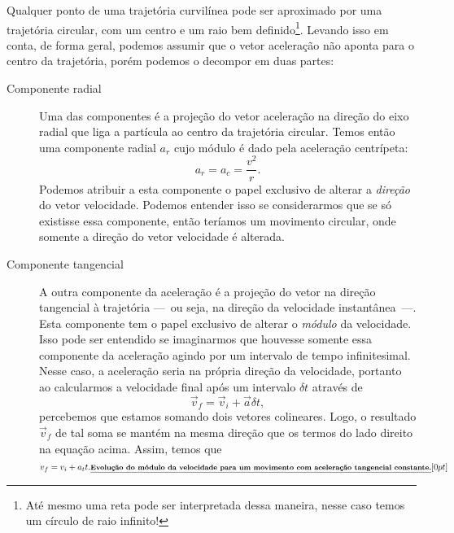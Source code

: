 Qualquer ponto de uma trajetória curvilínea pode ser aproximado por uma trajetória circular, com um centro e um raio bem definido\footnote{Até mesmo uma reta pode ser interpretada dessa maneira, nesse caso temos um círculo de raio infinito!}. Levando isso em conta, de forma geral, podemos assumir que o vetor aceleração não aponta para o centro da trajetória, porém podemos o decompor em duas partes:
\begin{description}
  \item[Componente radial] Uma das componentes é a projeção do vetor aceleração na direção do eixo radial que liga a partícula ao centro da trajetória circular. Temos então uma componente radial $a_r$ cujo módulo é dado pela aceleração centrípeta:
  \begin{equation}
    a_r = a_c = \frac{v^2}{r}.
  \end{equation}
  Podemos atribuir a esta componente o papel exclusivo de alterar a \emph{direção} do vetor velocidade. Podemos entender isso se considerarmos que se só existisse essa componente, então teríamos um movimento circular, onde somente a direção do vetor velocidade é alterada.
  \item[Componente tangencial] A outra componente da aceleração é a projeção do vetor na direção tangencial à trajetória ---~ou seja, na direção da velocidade instantânea~---. Esta componente tem o papel exclusivo de alterar o \emph{módulo} da velocidade. Isso pode ser entendido se imaginarmos que houvesse somente essa componente da aceleração agindo por um intervalo de tempo infinitesimal. Nesse caso, a aceleração seria na própria direção da velocidade, portanto ao calcularmos a velocidade final após um intervalo $\delta t$ através de
\begin{equation}
    \vec{v}_f = \vec{v}_i + \vec{a} \delta t,
\end{equation}
%
percebemos que estamos somando dois vetores colineares. Logo, o resultado $\vec{v}_f$ de tal soma se mantém na mesma direção que os termos do lado direito na equação acima. Assim, temos que
\begin{equation}\label{Eq:EvolModVelParaAcelTangConst}
  v_f = v_i + a_t t. \relax{\footnotesize\emph{\textbf{Evolução do módulo da velocidade para um movimento com aceleração tangencial constante.}}}[0pt]
\end{equation}
\end{description}

